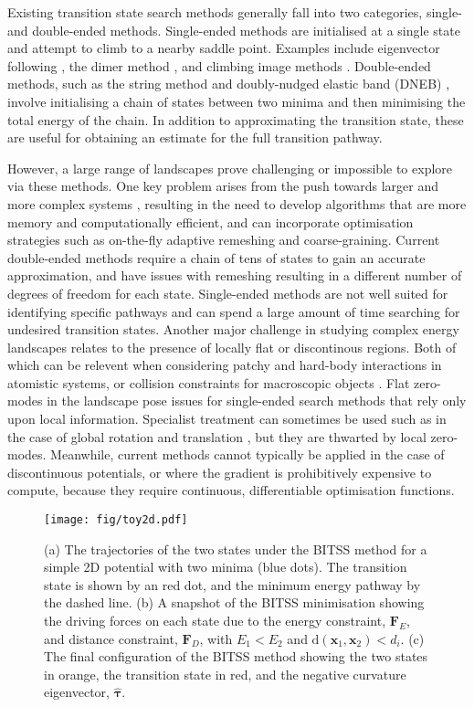 \documentclass[aps,prl,twocolumn,10pt,groupedaddress]{revtex4-2}
\begin{document}
Existing transition state search methods generally fall into two categories, single- and double-ended methods.
Single-ended methods are initialised at a single state and attempt to climb to a nearby saddle point.
Examples include eigenvector following \cite{Cerjan1981}, the dimer method \cite{Heyden2005,Kastner2008}, and climbing image methods \cite{E2007,Ren2013}.
Double-ended methods, such as the string method \cite{E2002,E2007} and doubly-nudged elastic band (DNEB) \cite{Trygubenko2004}, involve initialising a chain of states between two minima and then minimising the total energy of the chain.
In addition to approximating the transition state, these are useful for obtaining an estimate for the full transition pathway.

However, a large range of landscapes prove challenging or impossible to explore via these methods.
One key problem arises from the push towards larger and more complex systems \cite{Trefethen2013,Shalf2020,Alexander2020}, resulting in the need to develop algorithms that are more memory and computationally efficient, and can incorporate optimisation strategies such as on-the-fly adaptive remeshing and coarse-graining.
Current double-ended methods require a chain of tens of states to gain an accurate approximation, and have issues with remeshing resulting in a different number of degrees of freedom for each state.
Single-ended methods are not well suited for identifying specific pathways and can spend a large amount of time searching for undesired transition states.
Another major challenge in studying complex energy landscapes relates to the presence of locally flat or discontinous regions.
Both of which can be relevent when considering patchy \cite{McMullen2018,Nguemaha2018,Chen2018b} and hard-body \cite{Richard2018,Santra2018} interactions in atomistic systems, or collision constraints for macroscopic objects \cite{Wriggers2006}.
Flat zero-modes in the landscape pose issues for single-ended search methods that rely only upon local information.
Specialist treatment can sometimes be used such as in the case of global rotation and translation \cite{Page1988}, but they are thwarted by local zero-modes.
Meanwhile, current methods cannot typically be applied in the case of discontinuous potentials, or where the gradient is prohibitively expensive to compute, because they require continuous, differentiable optimisation functions.

\begin{figure}[htb]
  \texttt{[image: fig/toy2d.pdf]}
  \caption{\label{fig:toy2d}
    (a) The trajectories of the two states under the BITSS method for a simple 2D potential with two minima (blue dots).
        The transition state is shown by an red dot, and the minimum energy pathway by the dashed line.
    (b) A snapshot of the BITSS minimisation showing the driving forces on each state due to the energy constraint, $\bm{F}_E$, and distance constraint, $\bm{F}_D$, with $E_1 < E_2$ and $\mathrm{d}(\bm{x}_1,\bm{x}_2) < d_i$.
    (c) The final configuration of the BITSS method showing the two states in orange, the transition state in red, and the negative curvature eigenvector, $\bm{\hat{\tau}}$.
  }
\end{figure}
\end{document}
